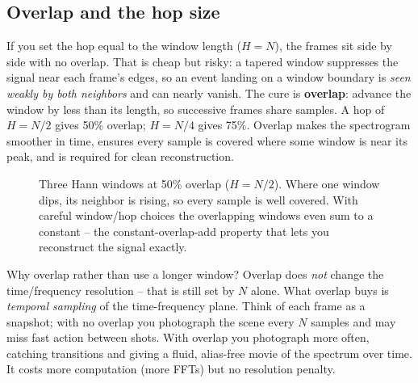 \subsection{Overlap and the hop size}

If you set the hop equal to the window length ($H = N$), the frames sit side by
side with no overlap. That is cheap but risky: a tapered window suppresses the
signal near each frame's edges, so an event landing on a window boundary is
\emph{seen weakly by both neighbors} and can nearly vanish. The cure is
\textbf{overlap}: advance the window by less than its length, so successive frames
share samples. A hop of $H = N/2$ gives 50\% overlap; $H = N/4$ gives 75\%.
Overlap makes the spectrogram smoother in time, ensures every sample is covered
where some window is near its peak, and is required for clean reconstruction.

\begin{figure}[H]
\centering
{}
\caption{Three Hann windows at 50\% overlap ($H = N/2$). Where one window dips,
its neighbor is rising, so every sample is well covered. With careful window/hop
choices the overlapping windows even sum to a constant -- the
constant-overlap-add property that lets you reconstruct the signal exactly.}
\label{ch10:fig-overlap}
\end{figure}

\begin{whybox}
Why overlap rather than use a longer window? Overlap does \emph{not} change the
time/frequency resolution -- that is still set by $N$ alone. What overlap buys is
\emph{temporal sampling} of the time-frequency plane. Think of each frame as a
snapshot; with no overlap you photograph the scene every $N$ samples and may miss
fast action between shots. With overlap you photograph more often, catching
transitions and giving a fluid, alias-free movie of the spectrum over time. It
costs more computation (more FFTs) but no resolution penalty.
\end{whybox}

